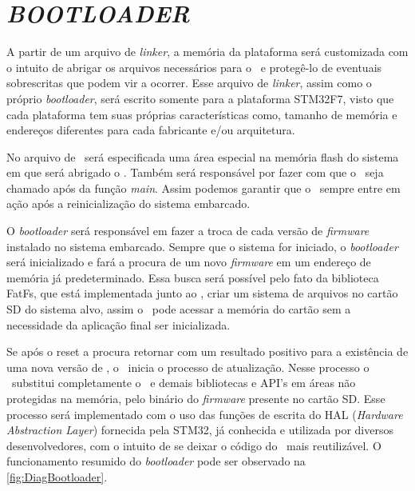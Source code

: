 \section{\textit{BOOTLOADER}}
\label{sec:Bootloader}

A partir de um arquivo de \textit{linker}, a memória da plataforma será customizada com o intuito de abrigar os arquivos necessários para o \bootloader\ e protegê-lo de eventuais sobrescritas que podem vir a ocorrer. Esse arquivo de \textit{linker}, assim como o próprio \textit{bootloader}, será escrito somente para a plataforma STM32F7, visto que cada plataforma tem suas próprias características como, tamanho de memória e endereços diferentes para cada fabricante e/ou arquitetura.

No arquivo de \linker\ será especificada uma área especial na memória flash do sistema em que será abrigado o \bootloader. Também será responsável por fazer com que o \bootloader\ seja chamado após da função \textit{main}. Assim podemos garantir que o \bootloader\ sempre entre em ação após a reinicialização do sistema embarcado.


O \textit{bootloader} será responsável em fazer a troca de cada versão de \textit{firmware} instalado no sistema embarcado. Sempre que o sistema for iniciado, o \textit{bootloader} será inicializado e fará a procura de um novo \textit{firmware} em um endereço de memória já predeterminado. Essa busca será possível pelo fato da biblioteca FatFs, que está implementada junto ao \bootloader, criar um sistema de arquivos no cartão SD do sistema alvo, assim o \bootloader\ pode acessar a memória do cartão sem a necessidade da aplicação final ser inicializada.

Se após o reset a procura retornar com um resultado positivo para a existência de uma nova versão de \software, o \bootloader\ inicia o processo de atualização. Nesse processo o \bootloader\ substitui completamente o \software\ e demais bibliotecas e API's em áreas não protegidas na memória, pelo binário do \textit{firmware} presente no cartão SD. Esse processo será implementado com o uso das funções de escrita do HAL (\textit{Hardware Abstraction Layer}) fornecida pela STM32, já conhecida e utilizada por diversos desenvolvedores, com o intuito de se deixar o código do \bootloader\ mais reutilizável. O funcionamento resumido do \textit{bootloader} pode ser observado na \autoref{fig:DiagBootloader}.

